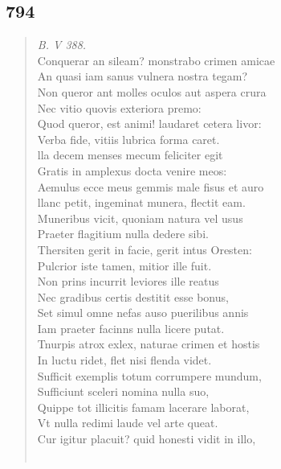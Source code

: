 \documentclass[11pt, a4paper]{report}
\begin{document}
            \subsection*{794}
      \begin{verse}
      \textit{B. V 388.} \\ Conquerar an sileam? monstrabo crimen amicae \\ An quasi iam sanus vulnera nostra tegam? \\ Non queror ant molles oculos aut aspera crura \\ Nec vitio quovis exteriora premo: \\ Quod queror, est animi! laudaret cetera livor: \\ Verba fide, vitiis lubrica forma caret. \\ lla decem menses mecum feliciter egit \\ Gratis in amplexus docta venire meos: \\ Aemulus ecce meus gemmis male fisus et auro \\ llanc petit, ingeminat munera, flectit eam. \\ Muneribus vicit, quoniam natura vel usus \\ Praeter flagitium nulla dedere sibi. \\ Thersiten gerit in facie, gerit intus Oresten: \\ Pulcrior iste tamen, mitior ille fuit. \\ Non prins incurrit leviores ille reatus \\ Nec gradibus certis destitit esse bonus, \\ Set simul omne nefas auso puerilibus annis \\ Iam praeter facinns nulla licere putat. \\ Tnurpis atrox exlex, naturae crimen et hostis \\ In luctu ridet, flet nisi flenda videt. \\ Sufficit exemplis totum corrumpere mundum, \\ Sufficiunt sceleri nomina nulla suo, \\ Quippe tot illicitis famam lacerare laborat, \\ Vt nulla redimi laude vel arte queat. \\ Cur igitur placuit? quid honesti vidit in illo, \\ 
        ﻿\pagebreak 

\end{verse}
\end{document}

